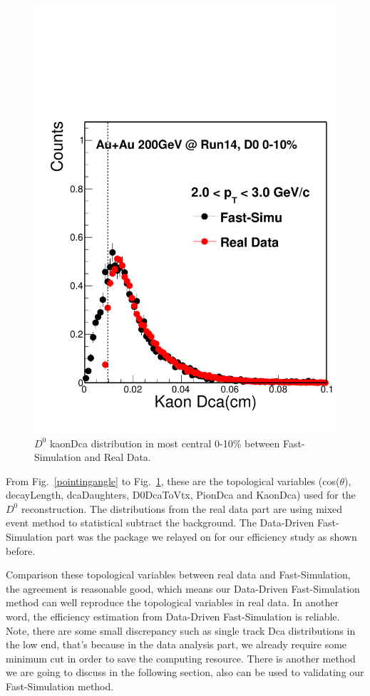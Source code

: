\documentclass[a4paper]{article}
\begin{document}
\begin{figure}[htbp]
\begin{minipage}[htbp]{0.52\linewidth}
\includegraphics[width=1.0\textwidth,angle=0]{fig/kaonDca.pdf} 
\caption{ $D^0$ kaonDca distribution in most central 0-10\% between Fast-Simulation and Real Data. \label{kaonDca}}
\end{minipage}
\end{figure}

From Fig.~\ref{pointingangle} to Fig.~\ref{kaonDca}, these are the topological variables (cos($\theta$), decayLength, dcaDaughters, D0DcaToVtx, PionDca and KaonDca) used for the $D^0$ reconstruction. The distributions from the real data part are using mixed event method to statistical subtract the background. The Data-Driven Fast-Simulation part was the package we relayed on for our efficiency study as shown before.

Comparison these topological variables between real data and Fast-Simulation, the agreement is reasonable good, which means our Data-Driven Fast-Simulation method can well reproduce the topological variables in real data. In another word, the efficiency estimation from Data-Driven Fast-Simulation is reliable. Note, there are some small discrepancy such as single track Dca distributions in the low end, that's because in the data analysis part, we already require some minimum cut in order to save the computing resource. There is another method we are going to discuss in the following section, also can be used to validating our Fast-Simulation method.
\end{document}
